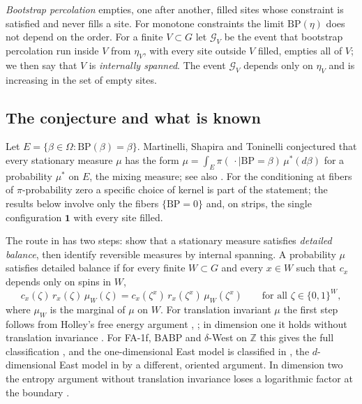 \documentclass[11pt]{amsart}
\theoremstyle{remark}
\newcommand{\Z}{\mathbb{Z}}
\newcommand{\BP}{\mathrm{BP}}
\begin{document}
\emph{Bootstrap percolation} empties, one after another, filled sites whose constraint is satisfied and never fills a
site. For monotone constraints the limit $\BP(\eta)$ does not depend on the order. For a finite $V\subset G$ let
$\mathcal G_V$ be the event that bootstrap percolation run inside $V$ from $\eta_V$, with every site outside $V$
filled, empties all of $V$; we then say that $V$ is \emph{internally spanned}. The event $\mathcal G_V$ depends only on
$\eta_V$ and is increasing in the set of empty sites.

\subsection{The conjecture and what is known}
Let $E=\{\beta\in\Omega:\BP(\beta)=\beta\}$. Martinelli, Shapira and Toninelli \cite[Conjecture~3]{MST25} conjectured
that every stationary measure $\mu$ has the form $\mu=\int_E\pi(\,\cdot\mid\BP=\beta)\,\mu^*(d\beta)$ for a probability
$\mu^*$ on $E$, the mixing measure; see also \cite[Conjecture~1.6]{Mar26}. For the conditioning at fibers of $\pi$-probability zero a
specific choice of kernel is part of the statement; the results below involve only the fibers $\{\BP=0\}$ and, on
strips, the single configuration $\mathbf 1$ with every site filled.

The route in \cite{MST25} has two steps: show that a stationary measure satisfies \emph{detailed balance}, then identify
reversible measures by internal spanning. A probability $\mu$ satisfies detailed balance if for every finite $W\subset
G$ and every $x\in W$ such that $c_x$ depends only on spins in $W$,
\begin{equation}\label{eq:db}
c_x(\zeta)\,r_x(\zeta)\,\mu_W(\zeta)=c_x(\zeta^x)\,r_x(\zeta^x)\,\mu_W(\zeta^x)\qquad\text{for all }\zeta\in\{0,1\}^W,
\end{equation}
where $\mu_W$ is the marginal of $\mu$ on $W$. For translation invariant $\mu$ the first step follows from Holley's free
energy argument \cite{Hol71}, \cite[Theorem~2.4]{MST25}; in dimension one it holds without translation invariance
\cite[Theorem~2.5]{MST25}. For FA-1f, BABP and $\delta$-West on $\Z$ this gives the full classification
\cite[Corollary~2.9]{MST25}, and the one-dimensional East model is classified in \cite[Theorem~2.12]{MST25}, the
$d$-dimensional East model in \cite[Theorem~2.13]{MST25} by a different, oriented argument. In dimension two the
entropy argument without translation invariance loses a logarithmic factor at the boundary \cite[Remark~2.16]{MST25}.
\end{document}
